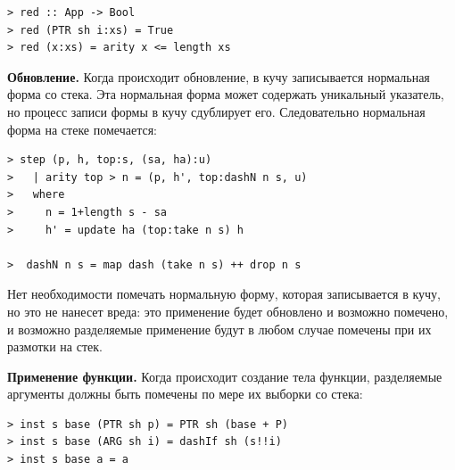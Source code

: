 \documentclass[flenqn, 14pt]{extarticle}
\begin{document}
\begin{verbatim}
> red :: App -> Bool
> red (PTR sh i:xs) = True
> red (x:xs) = arity x <= length xs
\end{verbatim} 

\textbf{Обновление.} Когда происходит обновление, в кучу записывается нормальная форма со стека. Эта нормальная форма может содержать уникальный указатель, но процесс записи формы в кучу сдублирует его. Следовательно нормальная форма на стеке помечается:
\begin{verbatim}
> step (p, h, top:s, (sa, ha):u)
>   | arity top > n = (p, h', top:dashN n s, u)
>   where
>     n = 1+length s - sa
>     h' = update ha (top:take n s) h

>  dashN n s = map dash (take n s) ++ drop n s
\end{verbatim}

Нет необходимости помечать нормальную форму, которая записывается в кучу, но это не нанесет вреда: это применение будет обновлено и возможно помечено, и возможно разделяемые применение будут в любом случае помечены при их размотки на стек. 

\textbf{Применение функции.} Когда происходит создание тела функции, разделяемые аргументы должны быть помечены по мере их выборки со стека:
\begin{verbatim}
> inst s base (PTR sh p) = PTR sh (base + P)
> inst s base (ARG sh i) = dashIf sh (s!!i)
> inst s base a = a
\end{verbatim}
\end{document}
